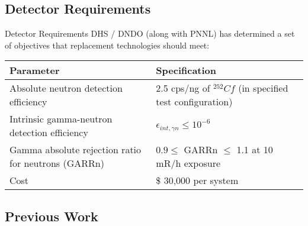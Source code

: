 \subsection{Detector Requirements}
\begin{frame}{Detector Requirements}
DHS / DNDO (along with PNNL) has determined a set of objectives that replacement technologies should meet:
\begin{table}
	\small
	\begin{tabular}{ m{5cm} m{5cm} }
	Parameter & Specification \\
	\hline
	\hline
	Absolute neutron detection efficiency & 2.5 cps/ng of ${}^{252}Cf$ (in specified test configuration) \\
	Intrinsic gamma-neutron detection efficiency & $ \epsilon_{int,\gamma n}\leq 10^{-6}$ \\
	Gamma absolute rejection ratio for neutrons (GARRn) & $ 0.9 \leq \text{ GARRn }\leq$ 1.1 at 10 mR/h exposure \\
	Cost &  \$ 30,000 per system \\
	\hline
	\end{tabular}
\end{table}
\hyperlink{PNNLCriteria}{}
\label{DHSCriteria}
\end{frame}

\subsection{Previous Work}

